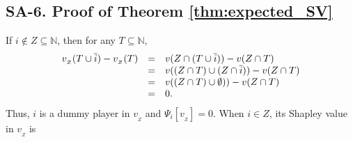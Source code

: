 \documentclass[a4paper,12pt]{article}
\begin{document}
\subsection*{SA-6. Proof of Theorem \ref{thm:expected_SV}}
\noindent
If $i\not \in Z \subseteq \mathbb{N}$, then for any $T\subseteq \mathbb{N}$,
$$
\begin{array}{rcl}
v_{_Z}(T\cup \overline{i})- v_{_Z}(T)
&=&
v \large (Z \cap (T\cup \overline{i}) \large ) - v (Z \cap T ) \\
&=&
v \large ((Z \cap T) \cup (Z \cap \overline{i}) \large  ) - v (Z \cap T ) \\
&=&
v \large ((Z \cap T) \cup \emptyset) \large ) - v (Z \cap T ) \\
&=&
0.
\end{array}
$$
Thus, $i$ is a dummy player in $v_{_Z}$ and $\Psi_i[v_{_Z}]=0$.
When $i \in Z$, its Shapley value in $v_{_Z}$ is
\end{document}
